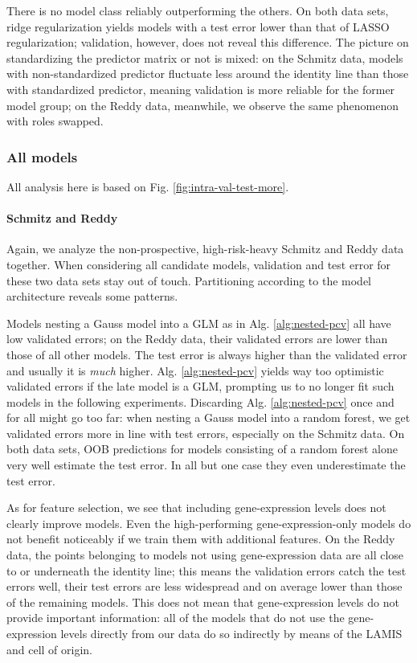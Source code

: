 There is no model class reliably outperforming the others. On both data sets, ridge 
regularization yields models with a test error lower than that of LASSO regularization; validation, 
however, does not reveal this difference. The picture on standardizing the predictor matrix or not 
is mixed: on the 
Schmitz data, models with non-standardized predictor fluctuate less around the identity line than 
those with standardized predictor, meaning validation is more reliable for the former model group;
on the Reddy data, meanwhile, we observe the same phenomenon with roles swapped.

\subsubsection{All models}



All analysis here is based on Fig. \ref{fig:intra-val-test-more}.

\paragraph{Schmitz and Reddy}
Again, we analyze the non-prospective, high-risk-heavy Schmitz and Reddy data together. When 
considering all candidate models, validation and test error for these two data sets 
stay out of touch. Partitioning according to the model architecture reveals some patterns. 

Models 
nesting a Gauss model into a GLM as in Alg. \ref{alg:nested-pcv} all have low validated errors; on 
the Reddy data, their validated errors are lower than those of all other models. The test error is 
always higher than the validated error and usually it is \textit{much} higher. Alg. \ref{alg:nested-pcv} 
yields way too optimistic validated errors if the late model is a GLM, prompting us to no longer 
fit such models in the following experiments. Discarding Alg. \ref{alg:nested-pcv} once and for all
might go too far: when nesting a Gauss model into a random forest, we get validated errors more in 
line with test errors, especially on the Schmitz data. On both data sets, OOB predictions for 
models consisting of a random forest alone very well estimate the test error. In all but one case 
they even underestimate the test error. 

As for feature selection, we see that including gene-expression levels does not clearly improve
models. Even the high-performing gene-expression-only models do not benefit noticeably if
we train them with additional features. On the Reddy data, the points belonging to models not using 
gene-expression data are all close to or underneath the identity line; this means the validation 
errors 
catch the test errors well, their test errors are less widespread and on average lower than those 
of the remaining models. This does not mean that gene-expression levels do not provide important 
information: all of the models that do not use the gene-expression levels directly from our data 
do so indirectly by means of the LAMIS and cell of origin. 

